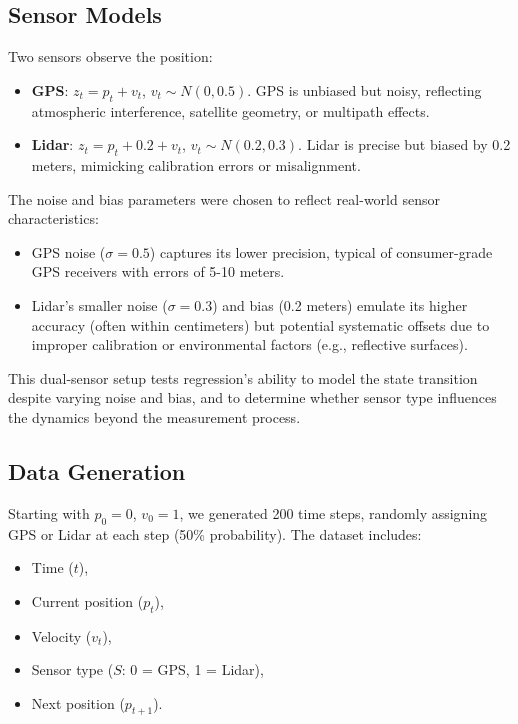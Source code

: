 \documentclass[12pt]{article}
\begin{document}
\subsection{Sensor Models}
\label{subsec:sensor_models}

Two sensors observe the position:
\begin{itemize}
    \item \textbf{GPS}: \( z_t = p_t + v_t \), \( v_t \sim N(0, 0.5) \). GPS is unbiased but noisy, reflecting atmospheric interference, satellite geometry, or multipath effects.
    \item \textbf{Lidar}: \( z_t = p_t + 0.2 + v_t \), \( v_t \sim N(0.2, 0.3) \). Lidar is precise but biased by 0.2 meters, mimicking calibration errors or misalignment.
\end{itemize}

The noise and bias parameters were chosen to reflect real-world sensor characteristics:
\begin{itemize}
    \item GPS noise (\( \sigma = 0.5 \)) captures its lower precision, typical of consumer-grade GPS receivers with errors of 5-10 meters.
    \item Lidar’s smaller noise (\( \sigma = 0.3 \)) and bias (0.2 meters) emulate its higher accuracy (often within centimeters) but potential systematic offsets due to improper calibration or environmental factors (e.g., reflective surfaces).
\end{itemize}

This dual-sensor setup tests regression’s ability to model the state transition despite varying noise and bias, and to determine whether sensor type influences the dynamics beyond the measurement process.

\subsection{Data Generation}
\label{subsec:data_generation}

Starting with \( p_0 = 0 \), \( v_0 = 1 \), we generated 200 time steps, randomly assigning GPS or Lidar at each step (50\% probability). The dataset includes:
\begin{itemize}
    \item Time (\( t \)),
    \item Current position (\( p_t \)),
    \item Velocity (\( v_t \)),
    \item Sensor type (\( S \): 0 = GPS, 1 = Lidar),
    \item Next position (\( p_{t+1} \)).
\end{itemize}
\end{document}
